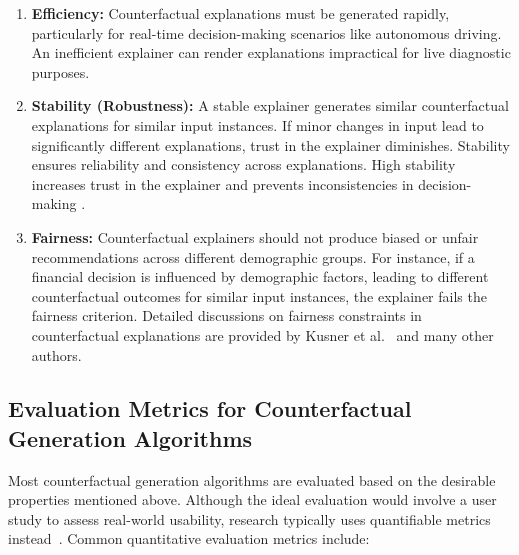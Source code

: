 \begin{enumerate}
    \item \textbf{Efficiency:}  
    Counterfactual explanations must be generated rapidly, particularly for real-time decision-making scenarios like autonomous driving. An inefficient explainer can render explanations impractical for live diagnostic purposes.

    \item \textbf{Stability (Robustness):}  
    A stable explainer generates similar counterfactual explanations for similar input instances. If minor changes in input lead to significantly different explanations, trust in the explainer diminishes. Stability ensures reliability and consistency across explanations. High stability increases trust in the explainer and prevents inconsistencies in decision-making \cite{9660058} \cite{Kanamori:AISTATS2022}.

    \item \textbf{Fairness:}  
    Counterfactual explainers should not produce biased or unfair recommendations across different demographic groups. For instance, if a financial decision is influenced by demographic factors, leading to different counterfactual outcomes for similar input instances, the explainer fails the fairness criterion. Detailed discussions on fairness constraints in counterfactual explanations are provided by Kusner et al.~\cite{DBLP:journals/corr/abs-2010-10596} and many other authors.
\end{enumerate}

\subsection{Evaluation Metrics for Counterfactual Generation Algorithms}
Most counterfactual generation algorithms are evaluated based on the desirable properties mentioned above. Although the ideal evaluation would involve a user study to assess real-world usability, research typically uses quantifiable metrics instead~\cite{Singh1622975, DBLP:journals/corr/abs-2010-10596, wang2024counterfactualexplanationsdeeplearningbased}. Common quantitative evaluation metrics include:

